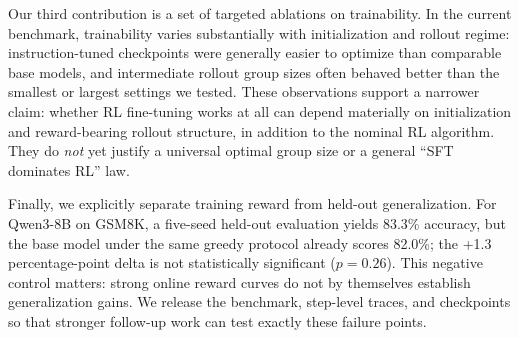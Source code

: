 Our third contribution is a set of targeted ablations on trainability. In the
current benchmark, trainability varies substantially with initialization and
rollout regime: instruction-tuned checkpoints were generally easier to
optimize than comparable base models, and intermediate rollout group sizes
often behaved better than the smallest or largest settings we tested. These
observations support a narrower claim: whether RL fine-tuning works at all can
depend materially on initialization and reward-bearing rollout structure, in
addition to the nominal RL algorithm. They do \emph{not} yet justify a
universal optimal group size or a general ``SFT dominates RL'' law.

Finally, we explicitly separate training reward from held-out generalization.
For Qwen3-8B on GSM8K, a five-seed held-out evaluation yields 83.3\% accuracy,
but the base model under the same greedy protocol already scores 82.0\%; the
+1.3 percentage-point delta is not statistically significant ($p{=}0.26$).
This negative control matters: strong online reward curves do not by themselves
establish generalization gains. We release the benchmark, step-level traces,
and checkpoints so that stronger follow-up work can test exactly these failure
points.
